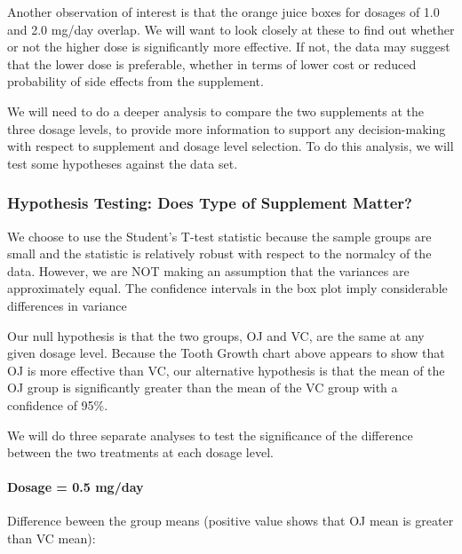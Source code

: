 \documentclass[]{article}
\newenvironment{Shaded}{\begin{snugshade}}{\end{snugshade}}
\newcommand{\KeywordTok}[1]{\textcolor[rgb]{0.13,0.29,0.53}{\textbf{#1}}}
\newcommand{\FloatTok}[1]{\textcolor[rgb]{0.00,0.00,0.81}{#1}}
\newcommand{\StringTok}[1]{\textcolor[rgb]{0.31,0.60,0.02}{#1}}
\newcommand{\OperatorTok}[1]{\textcolor[rgb]{0.81,0.36,0.00}{\textbf{#1}}}
\newcommand{\NormalTok}[1]{#1}
\let\oldparagraph\paragraph
\renewcommand{\paragraph}[1]{\oldparagraph{#1}\mbox{}}
\begin{document}
Another observation of interest is that the orange juice boxes for
dosages of 1.0 and 2.0 mg/day overlap. We will want to look closely at
these to find out whether or not the higher dose is significantly more
effective. If not, the data may suggest that the lower dose is
preferable, whether in terms of lower cost or reduced probability of
side effects from the supplement.

We will need to do a deeper analysis to compare the two supplements at
the three dosage levels, to provide more information to support any
decision-making with respect to supplement and dosage level selection.
To do this analysis, we will test some hypotheses against the data set.

\subsubsection{Hypothesis Testing: Does Type of Supplement
Matter?}\label{hypothesis-testing-does-type-of-supplement-matter}

We choose to use the Student's T-test statistic because the sample
groups are small and the statistic is relatively robust with respect to
the normalcy of the data. However, we are NOT making an assumption that
the variances are approximately equal. The confidence intervals in the
box plot imply considerable differences in variance

Our null hypothesis is that the two groups, OJ and VC, are the same at
any given dosage level. Because the Tooth Growth chart above appears to
show that OJ is more effective than VC, our alternative hypothesis is
that the mean of the OJ group is significantly greater than the mean of
the VC group with a confidence of 95\%.

We will do three separate analyses to test the significance of the
difference between the two treatments at each dosage level.

\paragraph{Dosage = 0.5 mg/day}\label{dosage-0.5-mgday}

Difference beween the group means (positive value shows that OJ mean is
greater than VC mean):

\begin{Shaded}
\end{Shaded}
\end{document}
